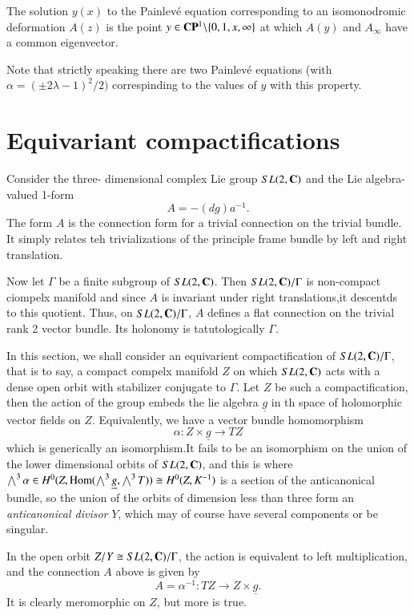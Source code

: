 \begin{prop}\label{art7-proposition-1}
The solution $y(x)$ to the Painlev\'e equation corresponding to an isomonodromic deformation $A(z)$ is the point $y \in \bC\bP^{1} \backslash \{ 0,1,\break x, \infty\}$ at which $A(y)$ and $A_{\infty}$ have a common eigenvector.
\end{prop}

Note that strictly speaking there are two Painlev\'e equations (with $\alpha = (\pm 2\lambda -1)^{2}/2)$ correspinding to the values of $y$ with this property.

\section{Equivariant compactifications}

Consider the three- dimensional complex Lie group $SL(2, \mathbf{C})$ and the Lie algebra-valued 1-form
$$
A = -(dg)a^{-1}.
$$
The form $A$ is the connection form for a trivial connection on the trivial bundle. It simply relates teh trivializations of the principle frame bundle by left and right translation.

Now let $\Gamma$ be a finite subgroup of $SL(2, \mathbf{C})$. Then $SL(2, \mathbf{C})/\Gamma$ is non-compact ciompelx manifold and since $A$ is invariant under right translations,it descentds to this quotient. Thus, on $SL(2, \mathbf{C})/\Gamma$, $A$ defines a flat connection on the trivial rank 2 vector bundle. Its holonomy is tatutologically $\Gamma$.

In this section, we shall consider an equivarient compactification of $SL(2, \mathbf{C})/\Gamma$,  that is to say, a compact compelx manifold $Z$ on which $SL(2, \mathbf{C})$ acts with a dense open orbit with stabilizer conjugate to $\Gamma$. Let $Z$ be such a compactification, then the action of the group embeds the lie algebra $\underline{g}$  in th space of holomorphic vector fields on $Z$. Equivalently, we have a vector bundle homomorphism
$$
\alpha: Z \times \underline{g} \rightarrow TZ
$$
which is generically an isomorphism.It fails to be an isomorphism on the union of the lower dimensional orbits of $SL(2, \mathbf{C})$, and this is where $\bigwedge^{3} \alpha \in H^{0}(Z, \operatorname{Hom}(\bigwedge^{3} \underline{g}, \bigwedge^{3}T)) \cong H^{0}(Z, K^{-1})$ is a section of the anticanonical bundle, so the union of the orbits of dimension less than three form an \textit{anticanonical divisor} $Y$, which may of course have several components or be singular.

 In the open orbit $Z/Y \cong SL(2, \mathbf{C})/\Gamma$, the action is equivalent to left multiplication, and the connection $A$ above is given by
 $$
 A = \alpha^{-1}: TZ \rightarrow  Z \times \underline{g}.
 $$
It is clearly meromorphic on $Z$, but more is true.

